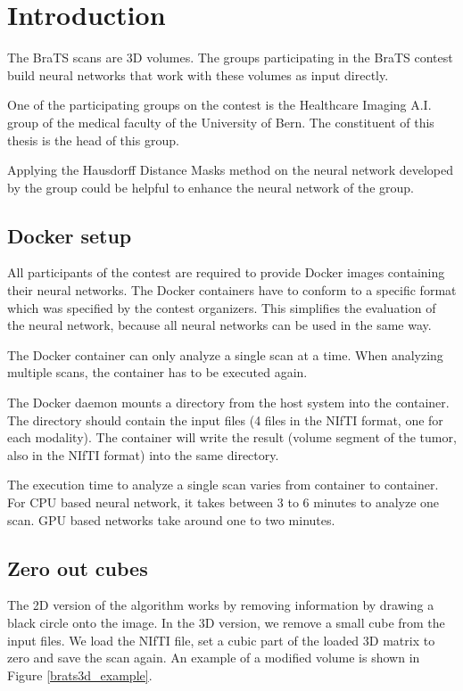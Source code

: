 \section{Introduction}
The BraTS scans are 3D volumes. The groups participating in the BraTS contest build neural networks that work with these volumes as input directly.

One of the participating groups on the contest is the Healthcare Imaging A.I. group of the medical faculty of the University of Bern. The constituent of this thesis
is the head of this group.

Applying the Hausdorff Distance Masks method on the neural network developed by the group could be helpful to enhance the neural network of the group.

\subsection{Docker setup}

All participants of the contest are required to provide Docker images containing their neural networks. The Docker containers have to conform to a specific format which
was specified by the contest organizers. This simplifies the evaluation of the neural network, because all neural networks can be used in the same way.

The Docker container can only analyze a single scan at a time. When analyzing multiple scans, the container has to be executed again.

The Docker daemon mounts a directory from the host system into the container. The directory should contain the input files (4 files in the NIfTI format, one for each modality). The container will write the result (volume segment of the tumor, also in the NIfTI format) into the same directory.

The execution time to analyze a single scan varies from container to container. For CPU based neural network, it takes between 3 to 6 minutes to analyze one scan. GPU based networks take around one to two minutes.

\subsection{Zero out cubes}
The 2D version of the algorithm works by removing information by drawing a black circle onto the image. In the 3D version, we remove a small cube from the input files.
We load the NIfTI file, set a cubic part of the loaded 3D matrix to zero and save the scan again. An example of a modified volume is shown in Figure \ref{brats3d_example}.

